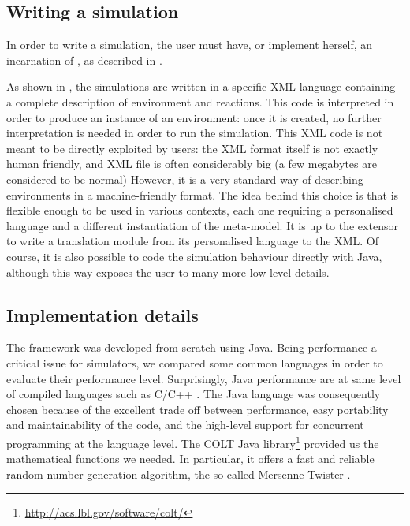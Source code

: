 \documentclass[12pt,a4paper,twoside,openright]{book}
\begin{document}

\subsection{Writing a simulation}


In order to write a simulation, the user must have, or implement herself, an incarnation of \alchemist{}, as described in .

As shown in , the simulations are written in a specific XML language containing a complete description of environment and reactions.
%
This code is interpreted in order to produce an instance of an environment: once it is created, no further interpretation is needed in order to run the simulation.
%
This XML code is not meant to be directly exploited by users: the XML format itself is not exactly human friendly, and XML file is often considerably big (a few megabytes are considered to be normal)
%
However, it is a very standard way of describing environments in a machine-friendly format.
%
The idea behind this choice is that \alchemist{} is flexible enough to be used in various contexts, each one requiring a personalised language and a different instantiation of the meta-model.
%
It is up to the extensor to write a translation module from its personalised language to the \alchemist{} XML.
%
Of course, it is also possible to code the simulation behaviour  directly with Java, although this way exposes the user to many more low level details.

\subsection{Implementation details}
The framework was developed from scratch using Java. Being performance a critical issue for simulators, we compared some common languages in order to evaluate their performance level.
%
Surprisingly, Java performance are at same level of compiled languages such as C/C++ \cite{bull2003, oancea2011}.
%
The Java language was consequently chosen because of the excellent trade off between performance, easy portability and maintainability of the code, and the high-level support for concurrent programming at the language level. 
%
The COLT Java library\footnote{\url{http://acs.lbl.gov/software/colt/}} provided us the mathematical functions we needed.
%
In particular, it offers a fast and reliable random number generation algorithm, the so called Mersenne Twister \cite{matsumoto1998}.
\end{document}
